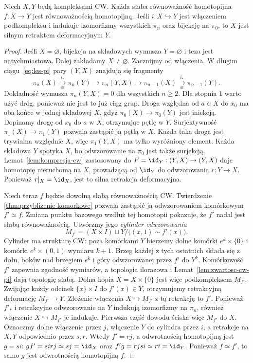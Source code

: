 \begin{twierdzenie}[Whitehead]
\label{thm:whitehead}
Niech $X,Y$ będą kompleksami CW.
Każda słaba równoważność homotopijna
$f:X\to Y$ jest równoważnością
homotopijną. Jeśli
$i:X\hookrightarrow Y$
jest włączeniem podkompleksu
i indukuje izomorfizmy
wszystkich $\pi_n$ oraz
bijekcję na $\pi_0$, to
$X$ jest silnym retraktem
deformacyjnym $Y$.
\end{twierdzenie}
\begin{proof}
Jeśli $X=\varnothing$, bijekcja na składowych wymusza $Y=\varnothing$
i teza jest natychmiastowa. Dalej zakładamy $X\ne\varnothing$.
Zacznijmy od włączenia.
W długim ciągu~\eqref{eq:les-pi}
pary $(Y,X)$ znajdują się
fragmenty
\[
 \pi_n(X)\xrightarrow[\cong]{i_*}
 \pi_n(Y)\longrightarrow
 \pi_n(Y,X)\longrightarrow
 \pi_{n-1}(X)
 \xrightarrow[\cong]{i_*}
 \pi_{n-1}(Y).
\]
Dokładność wymusza
$\pi_n(Y,X)=0$ dla
wszystkich $n\geq2$.
Dla stopnia $1$ warto użyć dróg, ponieważ nie jest to już ciąg grup.
Droga względna od $a\in X$ do $x_0$ ma oba końce w jednej składowej $X$,
gdyż $\pi_0(X)\to\pi_0(Y)$ jest iniekcją. Dopinamy drogę
od $x_0$ do $a$ w $X$, otrzymując pętlę w $Y$.
Surjektywność $\pi_1(X)\to\pi_1(Y)$ pozwala zastąpić ją pętlą w $X$.
Każda taka droga jest trywialna względnie $X$, więc $\pi_1(Y,X)$
ma tylko wyróżniony element. Każda składowa $Y$ spotyka $X$,
bo odwzorowanie na $\pi_0$ jest także surjekcją.
Lemat~\ref{lem:kompresja-cw}
zastosowany do
$F=\id_Y:(Y,X)\to(Y,X)$
daje homotopię nieruchomą
na $X$, prowadzącą od
$\id_Y$ do odwzorowania
$r:Y\to X$.
Ponieważ $r|_X=\id_X$,
jest to silna retrakcja
deformacyjna.

Niech teraz $f$ będzie
dowolną słabą równoważnością
CW. Twierdzenie
\ref{thm:przyblizenie-komorkowe}
pozwala zastąpić ją
odwzorowaniem komórkowym $f'\simeq f$.
Zmiana punktu bazowego wzdłuż tej homotopii pokazuje,
że $f'$ nadal jest słabą równoważnością.
Utwórzmy jego
\emph{cylinder odwzorowania}
\[
 M_{f'}=(X\times I)\sqcup Y/
       \bigl((x,1)\sim f'(x)\bigr).
\]
Cylinder ma strukturę CW: poza komórkami $Y$ bierzemy dolne
komórki $e^k\times\{0\}$ i komórki $e^k\times(0,1)$ wymiaru $k+1$.
Brzeg każdej z tych ostatnich składa się z dołu, boków nad
brzegiem $e^k$ i góry odwzorowanej przez $f'$ do $Y^k$.
Komórkowość $f'$ zapewnia zgodność wymiarów, a topologia
ilorazowa i Lemat~\ref{lem:zwartosc-cw-pi} dają topologię słabą.
Dolna kopia $X=X\times\{0\}$ jest więc podkompleksem $M_{f'}$.
Zwijając każdy odcinek
$\{x\}\times I$ do
$f'(x)\in Y$, otrzymujemy
retrakcyjną deformację
$M_{f'}\to Y$.
Złożenie włączenia
$X\hookrightarrow M_{f'}$
z tą retrakcją to $f'$.
Ponieważ $f'_*$ i
retrakcyjne odwzorowanie na $Y$
indukują izomorfizmy
na $\pi_n$, również
włączenie $X\hookrightarrow
M_{f'}$ je indukuje.
Pierwsza część dowodu
ściska więc $M_{f'}$
do $X$. Oznaczmy dolne włączenie przez $j$, włączenie $Y$ do cylindra przez $i$,
a retrakcje na $X,Y$ odpowiednio przez $s,r$.
Wtedy $f'=rj$, a odwrotnością homotopijną jest $g=si$:
$gf'=sirj\simeq sj=\id_X$ oraz $f'g=rjsi\simeq ri=\id_Y$.
Ponieważ $f\simeq f'$, to samo $g$ jest odwrotnością homotopijną $f$.
\end{proof}

